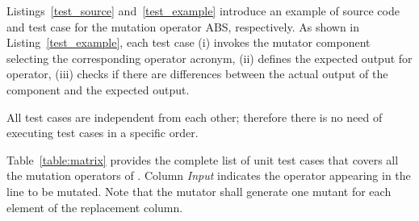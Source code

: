 Listings~\ref{test_source} and~\ref{test_example} introduce an example of source code and test case for the mutation operator ABS, respectively. As shown in Listing~\ref{test_example}, each test case (i) invokes the mutator component selecting the corresponding operator acronym, (ii) defines the expected output for operator, (iii) checks if there are differences between the actual output of the component and the expected output.

All test cases are independent from each other; therefore there is no need of executing test cases in a specific order.


Table~\ref{table:matrix} provides the complete list of unit test cases that covers all the mutation operators of \FAQAS. 
Column \emph{Input} indicates the operator appearing in the line to be mutated.
Note that the mutator shall generate one mutant for each element of the replacement column.



